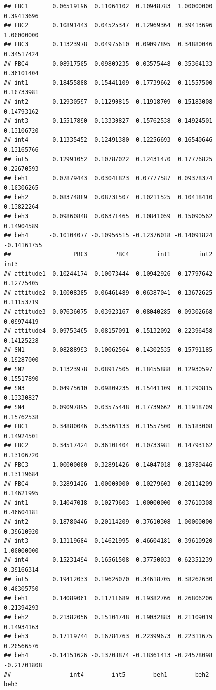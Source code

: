\documentclass[
]{article}
\begin{document}
\begin{verbatim}
## PBC1       0.06519196  0.11064102  0.10948783  1.00000000  0.39413696
## PBC2       0.10891443  0.04525347  0.12969364  0.39413696  1.00000000
## PBC3       0.11323978  0.04975610  0.09097895  0.34880046  0.34517424
## PBC4       0.08917505  0.09809235  0.03575448  0.35364133  0.36101404
## int1       0.18455888  0.15441109  0.17739662  0.11557500  0.10733981
## int2       0.12930597  0.11290815  0.11918709  0.15183008  0.14793162
## int3       0.15517890  0.13330827  0.15762538  0.14924501  0.13106720
## int4       0.11335452  0.12491380  0.12256693  0.16540646  0.13165766
## int5       0.12991052  0.10787022  0.12431470  0.17776825  0.22670593
## beh1       0.07879443  0.03041823  0.07777587  0.09378374  0.10306265
## beh2       0.08374889  0.08731507  0.10211525  0.10418410  0.13822264
## beh3       0.09860848  0.06371465  0.10841059  0.15090562  0.14904589
## beh4      -0.10104077 -0.10956515 -0.12376018 -0.14091824 -0.14161755
##                  PBC3        PBC4        int1        int2        int3
## attitude1  0.10244174  0.10073444  0.10942926  0.17797642  0.12775405
## attitude2  0.10008385  0.06461489  0.06387041  0.13672625  0.11153719
## attitude3  0.07636075  0.03923167  0.08040285  0.09302668  0.09974419
## attitude4  0.09753465  0.08157091  0.15132092  0.22396458  0.14125228
## SN1        0.08288993  0.10062564  0.14302535  0.15791185  0.19287000
## SN2        0.11323978  0.08917505  0.18455888  0.12930597  0.15517890
## SN3        0.04975610  0.09809235  0.15441109  0.11290815  0.13330827
## SN4        0.09097895  0.03575448  0.17739662  0.11918709  0.15762538
## PBC1       0.34880046  0.35364133  0.11557500  0.15183008  0.14924501
## PBC2       0.34517424  0.36101404  0.10733981  0.14793162  0.13106720
## PBC3       1.00000000  0.32891426  0.14047018  0.18780446  0.13119684
## PBC4       0.32891426  1.00000000  0.10279603  0.20114209  0.14621995
## int1       0.14047018  0.10279603  1.00000000  0.37610308  0.46604181
## int2       0.18780446  0.20114209  0.37610308  1.00000000  0.39610920
## int3       0.13119684  0.14621995  0.46604181  0.39610920  1.00000000
## int4       0.15231494  0.16561508  0.37750033  0.62351239  0.39166314
## int5       0.19412033  0.19626070  0.34618705  0.38262630  0.40305750
## beh1       0.14089061  0.11711689  0.19382766  0.26806206  0.21394293
## beh2       0.21382056  0.15104748  0.19032883  0.21109019  0.14934163
## beh3       0.17119744  0.16784763  0.22399673  0.22311675  0.20566576
## beh4      -0.14151626 -0.13708874 -0.18361413 -0.24578098 -0.21701808
##                 int4        int5        beh1        beh2        beh3

\end{verbatim}
\end{document}
